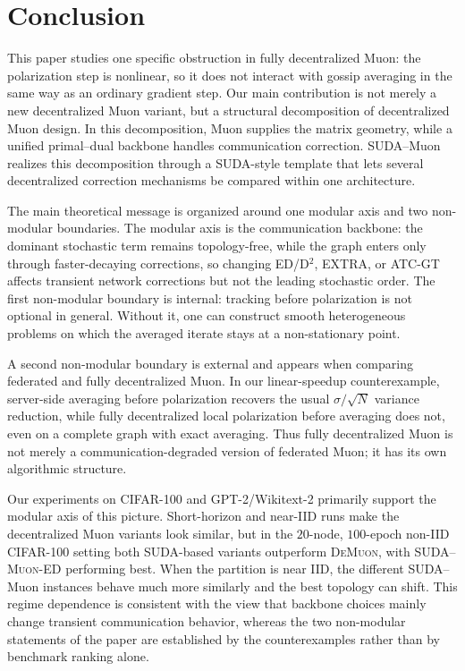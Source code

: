 \documentclass{article}
\newcommand{\sudamuon}{SUDA--Muon}
\begin{document}
\section{Conclusion}\label{sec:conclusion}


This paper studies one specific obstruction in fully decentralized Muon: the
polarization step is nonlinear, so it does not interact with gossip averaging
in the same way as an ordinary gradient step. Our main contribution is not
merely a new decentralized Muon variant, but a structural decomposition of
decentralized Muon design. In this decomposition, Muon supplies the matrix
geometry, while a unified primal--dual backbone handles communication
correction. \sudamuon{} realizes this decomposition through a SUDA-style
template that lets several decentralized correction mechanisms be compared
within one architecture.



The main theoretical message is organized around one modular axis and two
non-modular boundaries. The modular axis is the communication backbone: the
dominant stochastic term remains topology-free, while the graph enters only
through faster-decaying corrections, so changing ED/D$^2$, EXTRA, or ATC-GT
affects transient network corrections but not the leading stochastic order. The
first non-modular boundary is internal: tracking before polarization is not
optional in general. Without it, one can construct smooth heterogeneous
problems on which the averaged iterate stays at a non-stationary point.



A second non-modular boundary is external and appears when comparing federated and fully
decentralized Muon. In our linear-speedup counterexample, server-side averaging
before polarization recovers the usual $\sigma/\sqrt{N}$ variance reduction,
while fully decentralized local polarization before averaging does not, even on
a complete graph with exact averaging. Thus fully decentralized Muon is not
merely a communication-degraded version of federated Muon; it has its own
algorithmic structure.



Our experiments on CIFAR-100 and GPT-2/Wikitext-2 primarily support the
modular axis of this picture. Short-horizon and near-IID runs make the decentralized Muon variants look similar, but in the $20$-node, $100$-epoch non-IID CIFAR-100 setting both SUDA-based variants outperform \textsc{DeMuon}, with \textsc{SUDA--Muon-ED} performing best. When the partition is near IID, the
different SUDA--Muon instances behave much more similarly and the best
topology can shift. This regime dependence is consistent with the view that
backbone choices mainly change transient communication behavior, whereas the
two non-modular statements of the paper are established by the counterexamples
rather than by benchmark ranking alone.
\end{document}
